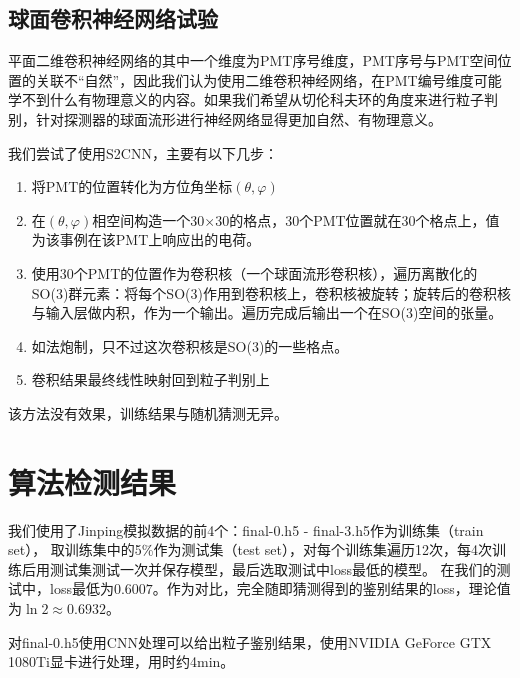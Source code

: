 \documentclass{ctexart}
\begin{document}
\subsection{球面卷积神经网络试验} %
\label{sub:球面卷积神经网络试验}
平面二维卷积神经网络的其中一个维度为PMT序号维度，PMT序号与PMT空间位置的关联不“自然”，因此我们认为使用二维卷积神经网络，在PMT编号维度可能学不到什么有物理意义的内容。如果我们希望从切伦科夫环的角度来进行粒子判别，针对探测器的球面流形进行神经网络显得更加自然、有物理意义。

我们尝试了使用S2CNN，主要有以下几步：
\begin{enumerate}
    \item 将PMT的位置转化为方位角坐标$(\theta, \varphi)$
    \item 在$(\theta, \varphi)$相空间构造一个30$\times$30的格点，30个PMT位置就在30个格点上，值为该事例在该PMT上响应出的电荷。
    \item 使用30个PMT的位置作为卷积核（一个球面流形卷积核），遍历离散化的SO(3)群元素：将每个SO(3)作用到卷积核上，卷积核被旋转；旋转后的卷积核与输入层做内积，作为一个输出。遍历完成后输出一个在SO(3)空间的张量。
    \item 如法炮制，只不过这次卷积核是SO(3)的一些格点。
    \item 卷积结果最终线性映射回到粒子判别上
\end{enumerate}

该方法没有效果，训练结果与随机猜测无异。


\section{算法检测结果}
我们使用了Jinping模拟数据的前4个：final-0.h5 - final-3.h5作为训练集（train set），
取训练集中的5\%作为测试集（test set），对每个训练集遍历12次，每4次训练后用测试集测试一次并保存模型，最后选取测试中loss最低的模型。
在我们的测试中，loss最低为$0.6007$。作为对比，完全随即猜测得到的鉴别结果的loss，理论值为$\ln{2}\approx0.6932$。

对final-0.h5使用CNN处理可以给出粒子鉴别结果，使用NVIDIA GeForce GTX 1080Ti显卡进行处理，用时约4min。
\end{document}
